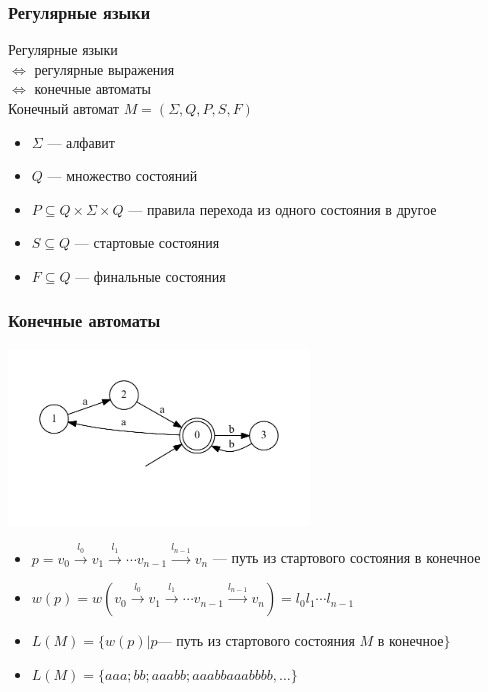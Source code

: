 \documentclass[xcolor=table]{beamer}
\begin{document}
\begin{frame}[fragile]
  \transwipe[direction=90]
  \frametitle{Регулярные языки}
  Регулярные языки \\ $\Longleftrightarrow$ регулярные выражения \\ $\Longleftrightarrow$ конечные 
  автоматы \\
  Конечный автомат $M=(\Sigma,Q,P,S,F)$
      \begin{itemize}
        \item $\Sigma$ --- алфавит
        \item $Q$ --- множество состояний
        \item $P \subseteq Q \times \Sigma \times Q$ --- правила перехода из одного состояния в другое
        \item $S \subseteq Q$ --- стартовые состояния
        \item $F \subseteq Q$ --- финальные состояния
    \end{itemize}
\end{frame}

\begin{frame}[fragile]
  \transwipe[direction=90]
  \frametitle{Конечные автоматы}
\begin{center}
        \includegraphics[width=0.6\textwidth]{pictures/atm.pdf} 
\end{center}
  \begin{itemize}
  \item $p = v_0 \xrightarrow{l_0} v_1 \xrightarrow{l_1} \cdots v_{n-1}\xrightarrow{l_{n-1}}v_n$ --- путь из стартового состояния в конечное
  \item $w(p) = w(v_0 \xrightarrow{l_0} v_1 \xrightarrow{l_1} \cdots v_{n-1}\xrightarrow{l_{n-1}}v_n) = l_0 l_1 \cdots l_{n-1}$
  \item $L(M) = \{w(p) | p  \text{--- путь из стартового состояния $M$ в конечное}\}$
  \item $L(M) = \{aaa; bb; aaabb; aaabbaaabbbb, \dots\}$
  \end{itemize}

\end{frame}
\end{document}
